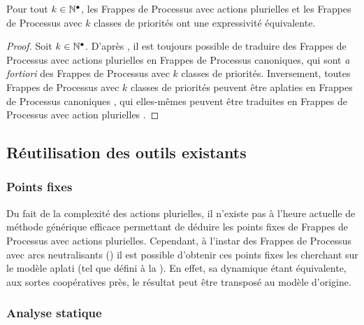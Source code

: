 \begin{theorem}[Équivalence]
  Pour tout $k \in \mathbb{N}^\bullet$,
  les Frappes de Processus avec actions plurielles
  et les Frappes de Processus avec $k$ classes de priorités
  ont une expressivité équivalente.
\end{theorem}

\begin{proof}
  Soit $k \in \mathbb{N}^\bullet$.
  D'après \storef, il est toujours possible de traduire des Frappes de Processus avec actions
  plurielles en Frappes de Processus canoniques, qui sont \textit{a fortiori}
  des Frappes de Processus avec $k$ classes de priorités.
  Inversement, toutes Frappes de Processus avec $k$ classes de priorités
  peuvent être aplaties en Frappes de Processus canoniques \storef,
  qui elles-mêmes peuvent être traduites en Frappes de Processus avec action plurielles \storef.
\end{proof}



\subsection{Réutilisation des outils existants}



\subsubsection{Points fixes}

Du fait de la complexité des actions plurielles, il n'existe pas à l'heure actuelle de méthode
générique efficace permettant de déduire les points fixes de Frappes de Processus avec
actions plurielles.
Cependant, à l'instar des Frappes de Processus avec arcs neutralisants
()
il est possible d'obtenir ces points fixes les cherchant sur
le modèle aplati (tel que défini à la ).
En effet, sa dynamique étant équivalente, aux sortes coopératives près, le résultat
peut être transposé au modèle d'origine.

\subsubsection{Analyse statique}

